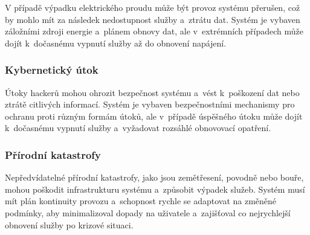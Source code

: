 		V případě výpadku elektrického proudu může být provoz systému přerušen, což by mohlo mít za následek nedostupnost služby a~ztrátu dat. Systém je vybaven záložními zdroji energie a~plánem obnovy dat, ale v~extrémních případech může dojít k~dočasnému vypnutí služby až do obnovení napájení.

    	\subsubsection{Kybernetický útok} 

		Útoky hackerů mohou ohrozit bezpečnost systému a~vést k~poškození dat nebo ztrátě citlivých informací. Systém je vybaven bezpečnostními mechanismy pro ochranu proti různým formám útoků, ale v~případě úspěšného útoku může dojít k~dočasnému vypnutí služby a~vyžadovat rozsáhlé obnovovací opatření.

    	\subsubsection{Přírodní katastrofy} 

		Nepředvídatelné přírodní katastrofy, jako jsou zemětřesení, povodně nebo bouře, mohou poškodit infrastrukturu systému a~způsobit výpadek služeb. Systém musí mít plán kontinuity provozu a~schopnost rychle se adaptovat na změněné podmínky, aby minimalizoval dopady na uživatele a~zajišťoval co nejrychlejší obnovení služby po krizové situaci.
	
\pagebreak
